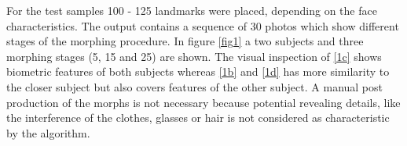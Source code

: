 For the test samples 100 - 125 landmarks were placed, depending on the face characteristics. The output contains a sequence of 30 photos which show different stages of the morphing procedure. 
In figure \ref{fig1} a two subjects and three morphing stages (5, 15 and 25) are shown. The visual inspection of \ref{1c} shows biometric features of both subjects whereas \ref{1b} and \ref{1d} has more similarity to the closer subject but also covers features of the other subject.
A manual post production of the morphs is not necessary because potential revealing details, like the interference  of the clothes, glasses or hair is not considered as characteristic by the algorithm. 


